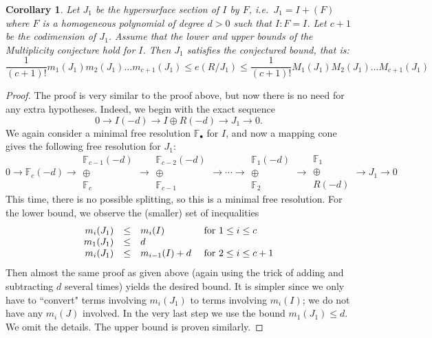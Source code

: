 \documentclass[12pt,twoside]{amsart}
\numberwithin{equation}{section}
\newtheorem{corollary}[theorem]{Corollary}
\theoremstyle{definition}
\begin{document}
\begin{corollary}
Let $J_1$ be the hypersurface section of $I$ by $F$, i.e.\ $J_1 = I + (F)$ where $F$ is a
homogeneous polynomial of degree $d > 0$ such that $I : F = I$. Let $c+1$ be the
codimension of $J_1$. Assume that the lower and upper bounds of the Multiplicity
conjecture hold for $I$. Then $J_1$ satisfies the conjectured bound, that is:
\[
\frac{1}{(c+1)!} m_1(J_1) m_2(J_1) \dots m_{c+1}(J_1) \leq e(R/J_1) \leq \frac{1}{(c+1)!}
M_1(J_1) M_2(J_1) \dots M_{c+1}(J_1)
\]
\end{corollary}

\begin{proof}
The proof is very similar to the proof above, but now there is no need for any extra
hypotheses.  Indeed, we begin with the exact sequence
\[
0 \rightarrow I(-d) \rightarrow I \oplus R(-d) \rightarrow J_1
\rightarrow 0.
\]
We again consider a minimal free resolution $\mathbb F_\bullet$ for $I$, and
now a mapping cone gives the following free resolution for $J_1$:
\[
0 \rightarrow  \mathbb F_c(-d) \rightarrow
\begin{array}{c}
\mathbb F_{c-1}(-d) \\
\oplus \\
\mathbb F_c
\end{array}
\rightarrow
\begin{array}{c}
\mathbb F_{c-2}(-d) \\
\oplus \\
\mathbb F_{c-1}
\end{array}
\rightarrow \cdots \rightarrow
\begin{array}{c}
\mathbb F_1(-d) \\
\oplus \\
\mathbb F_2
\end{array}
\rightarrow
\begin{array}{c}
\mathbb F_1 \\
\oplus \\
R(-d)
\end{array}
\rightarrow J_1\rightarrow 0
\]
This time, there is no possible splitting, so this is a minimal free resolution. For the
lower bound, we observe the (smaller) set of inequalities
\begin{equation} \label{facts}
\begin{array}{rcll}
m_i(J_1) & \leq & m_i(I) & \hbox{ for  } 1 \leq i \leq c \\
m_1(J_1) & \leq & d \\
m_i(J_1) & \leq & m_{i-1}(I) +d &  \hbox{ for } 2 \leq i \leq c+1
\end{array}
\end{equation}
Then almost the same proof as given above (again using the trick of adding and
subtracting $d$ several times) yields the desired bound.  It is
simpler since we
only have to ``convert" terms involving
$m_i(J_1)$ to terms involving $m_i(I)$; we do not have any $m_i(J)$ involved.
In the very last step we use the bound $m_1(J_1) \leq d$.  We omit the details.  The upper bound is proven similarly.
\end{proof}
\end{document}
